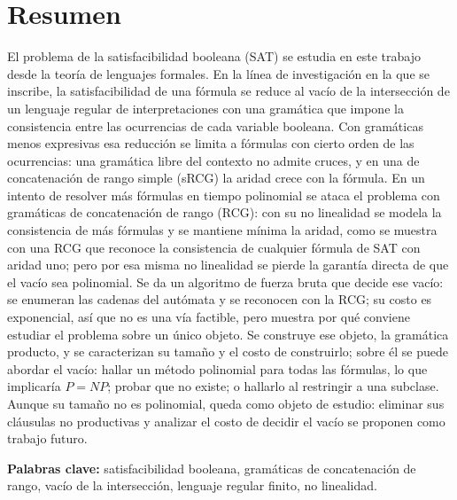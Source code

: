 \documentclass{report}
\begin{document}
\chapter*{Resumen}

El problema de la satisfacibilidad booleana (SAT) se estudia en este
trabajo desde la teoría de lenguajes formales. En la línea de
investigación en la que se inscribe, la satisfacibilidad de una fórmula
se reduce al vacío de la intersección de un lenguaje regular de
interpretaciones con una gramática que impone la consistencia entre las
ocurrencias de cada variable booleana.
Con gramáticas menos expresivas esa reducción se limita a fórmulas con
cierto orden de las ocurrencias: una gramática libre del contexto no
admite cruces, y en una de concatenación de rango simple (sRCG) la aridad
crece con la fórmula. En un intento de resolver más fórmulas en tiempo
polinomial se ataca el problema con gramáticas de concatenación de rango
(RCG): con su no linealidad se modela la consistencia de más fórmulas y
se mantiene mínima la aridad, como se muestra con una RCG que reconoce la
consistencia de cualquier fórmula de SAT con aridad uno; pero por esa
misma no linealidad se pierde la garantía directa de que el vacío sea
polinomial.
Se da un algoritmo de fuerza bruta que decide ese vacío: se enumeran las
cadenas del autómata y se reconocen con la RCG; su costo es exponencial,
así que
no es una vía factible, pero muestra por qué conviene estudiar el
problema sobre un único objeto. Se construye ese objeto, la gramática
producto, y se caracterizan su tamaño y el costo de construirlo; sobre él
se puede abordar el vacío: hallar un método polinomial para todas las
fórmulas, lo que implicaría $P = NP$; probar que no existe; o hallarlo al
restringir a una subclase. Aunque su
tamaño no es polinomial, queda como objeto de estudio: eliminar sus
cláusulas no productivas y analizar el costo de decidir el vacío se
proponen como trabajo futuro.

\vspace{1em}
\noindent\textbf{Palabras clave:} satisfacibilidad booleana, gramáticas
de concatenación de rango, vacío de la intersección, lenguaje regular
finito, no linealidad.
\end{document}
